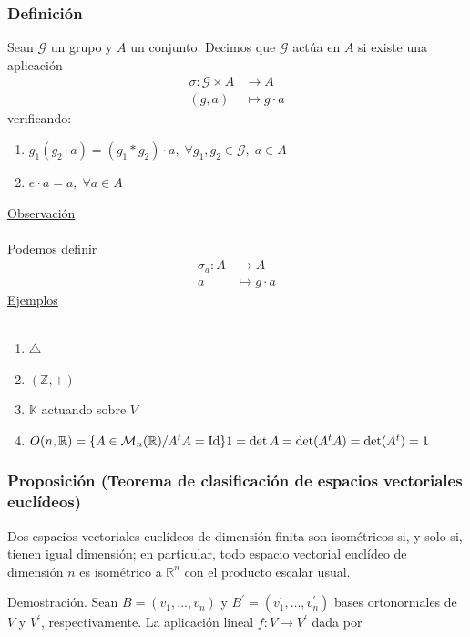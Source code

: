 \documentclass[12pt, a4paper, ones, notitlepage, openany,titlepage]{article}
\begin{document}
\subsubsection{Definición}
Sean $\mathcal{G}$ un grupo y $A$ un conjunto. Decimos que $\mathcal{G}$ actúa en $A$ si existe una aplicación
$$
\begin{aligned}
	\sigma: \mathcal{G} \times A & \longrightarrow A \\
	(g, a) & \longmapsto g \cdot a
\end{aligned}
$$
verificando:
\begin{enumerate}
	\item $g_1(g_2 \cdot a) = (g_1 * g_2) \cdot a, \; \forall g_1, g_2 \in \mathcal{G}, \; a \in A$
	\item $e \cdot a = a, \; \forall a \in A$
\end{enumerate}
\underline{Observación}\\\\
Podemos definir
$$
\begin{aligned}
	\sigma_a : A & \longrightarrow A \\
	a & \longmapsto g \cdot a
\end{aligned}
$$
\underline{Ejemplos}\\\\
\begin{enumerate}
	\item $\triangle$
	\item $(\mathbb{Z},+)$
	\item $\mathbb{K}$ actuando sobre $V$
	\item $O(n, \mathbb{R}) = \{A \in \mathcal{M}_n (\mathbb{R}) /
	A^t A = \operatorname{Id}\} \\
	1 = \operatorname{det}A = \operatorname{det}(A^tA) = \operatorname{det}(A^t) = 1$
\end{enumerate}

\subsubsection{Proposición (Teorema de clasificación de espacios vectoriales euclídeos)}
Dos espacios vectoriales euclídeos de dimensión finita son isométricos si, y solo si, tienen igual dimensión; en particular, todo espacio vectorial euclídeo de dimensión $n$ es isométrico a $\mathbb{R}^{n}$ con el producto escalar usual.

Demostración. Sean $B=\left(v_{1}, \ldots, v_{n}\right)$ y $B^{\prime}=\left(v_{1}^{\prime}, \ldots, v_{n}^{\prime}\right)$ bases ortonormales de $V$ y $V^{\prime}$, respectivamente. La aplicación lineal $f: V \rightarrow V^{\prime}$ dada por
\end{document}

